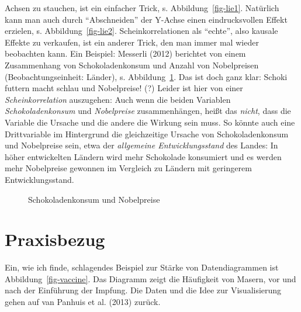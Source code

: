 \documentclass[
  letterpaper,
  twoside,
  open=any]{scrbook}
\theoremstyle{definition}
\theoremstyle{definition}
\theoremstyle{definition}
\theoremstyle{remark}
\begin{document}
Achsen zu stauchen, ist ein einfacher Trick, s.
Abbildung~\ref{fig-lie1}. Natürlich kann man auch durch
\enquote{Abschneiden} der Y-Achse einen eindrucksvollen Effekt erzielen,
s. Abbildung~\ref{fig-lie2}. Scheinkorrelationen als \enquote{echte},
also kausale Effekte zu verkaufen, ist ein anderer Trick, den man immer
mal wieder beobachten kann. Ein Beispiel: Messerli (2012) berichtet von
einem Zusammenhang von Schokoladenkonsum und Anzahl von Nobelpreisen
(Beobachtungseinheit: Länder), s. Abbildung~\ref{fig-choc}. Das ist doch
ganz klar: Schoki futtern macht schlau und Nobelpreise! (?) Leider ist
hier von einer \emph{Scheinkorrelation} auszugehen: Auch wenn die beiden
Variablen \emph{Schokoladenkonsum} und \emph{Nobelpreise}
zusammenhängen, heißt das \emph{nicht}, dass die Variable die Ursache
und die andere die Wirkung sein muss. So könnte auch eine Drittvariable
im Hintergrund die gleichzeitige Ursache von Schokoladenkonsum und
Nobelpreise sein, etwa der \emph{allgemeine Entwicklungsstand} des
Landes: In höher entwickelten Ländern wird mehr Schokolade konsumiert
und es werden mehr Nobelpreise gewonnen im Vergleich zu Ländern mit
geringerem Entwicklungsstand.

\begin{figure}


\caption{\label{fig-choc}Schokoladenkonsum und Nobelpreise}

\end{figure}%

\section{Praxisbezug}\label{praxisbezug-3}

Ein, wie ich finde, schlagendes Beispiel zur Stärke von Datendiagrammen
ist Abbildung~\ref{fig-vaccine}. Das Diagramm zeigt die Häufigkeit von
Masern, vor und nach der Einführung der Impfung. Die Daten und die Idee
zur Visualisierung gehen auf van Panhuis et al. (2013) zurück.
\end{document}
